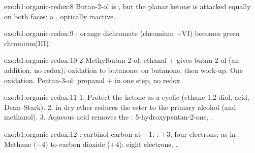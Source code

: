 \begin{solution}{exo:b1:organic-redox:8}
Butan-2-ol is , but the planar ketone is attacked equally on both
faces: a , optically inactive.
\end{solution}

\begin{solution}{exo:b1:organic-redox:9}
: orange
dichromate (chromium $+$VI) becomes green chromium(III).
\end{solution}

\begin{solution}{exo:b1:organic-redox:10}
2-Methylbutan-2-ol: ethanal +  gives butan-2-ol (an
addition, no redox); oxidation to butanone;  on butanone,
then work-up. One oxidation. Pentan-3-ol: propanal +  in
one step, no redox.
\end{solution}

\begin{solution}{exo:b1:organic-redox:11}
1. Protect the ketone as a cyclic  (ethane-1,2-diol, acid,
Dean--Stark). 2.  in dry ether reduces the ester to the
primary alcohol (and methanol). 3. Aqueous acid removes the :
5-hydroxypentan-2-one, .
\end{solution}

\begin{solution}{exo:b1:organic-redox:12}
: carbinol carbon at $-1$; : $+3$; four electrons, as in
. Methane ($-4$) to carbon dioxide
($+4$): eight electrons, .
\end{solution}

